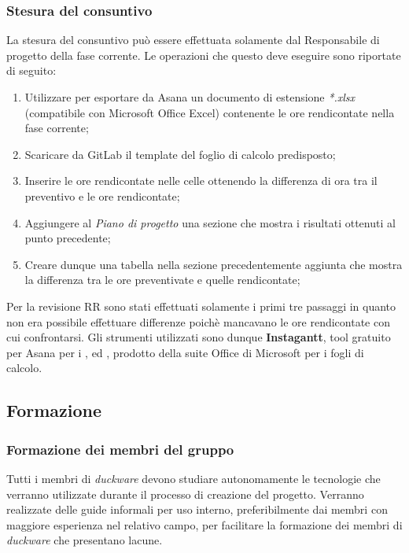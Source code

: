 \subsubsection{Stesura del consuntivo}
La stesura del consuntivo può essere effettuata solamente dal Responsabile di progetto della fase corrente. Le operazioni che questo deve eseguire sono riportate di seguito:

\begin{enumerate}
    \item Utilizzare  per esportare da Asana un documento di estensione \textit{*.xlsx} (compatibile con Microsoft Office Excel) contenente le ore rendicontate nella fase corrente;
    \item Scaricare da GitLab il template del foglio di calcolo predisposto;
    \item Inserire le ore rendicontate nelle celle ottenendo la differenza di ora tra il preventivo e le ore rendicontate;
    \item Aggiungere al \textit{Piano di progetto} una sezione che mostra i risultati ottenuti al punto precedente;
    \item Creare dunque una tabella nella sezione precedentemente aggiunta che mostra la differenza tra le ore preventivate e quelle rendicontate;
\end{enumerate}

Per la revisione RR sono stati effettuati solamente i primi tre passaggi in quanto non era possibile effettuare differenze poichè mancavano le ore rendicontate con cui confrontarsi. Gli strumenti utilizzati sono dunque \textbf{Instagantt}, tool gratuito per Asana per i , ed , prodotto della suite Office di Microsoft per i fogli di calcolo.

\subsection{Formazione}
\label{sec:formazione}
\subsubsection{Formazione dei membri del gruppo}
Tutti i membri di \emph{duckware} devono studiare autonomamente le tecnologie che verranno utilizzate durante il processo di creazione del progetto. Verranno realizzate delle guide informali per uso interno, preferibilmente dai membri con maggiore esperienza nel relativo campo, per facilitare la formazione dei membri di \emph{duckware} che presentano lacune.

